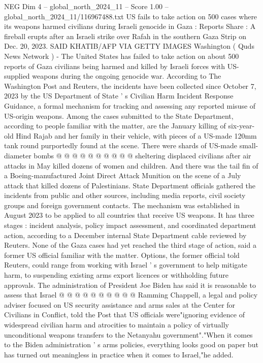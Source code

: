 \begin{textsample}{NEG Dim 4 – global\_north\_2024\_11 – Score 1.00 – global\_north\_2024\_11/116967488.txt}  \label{ex:f4_neg_175}
US fails to take action on 500 cases where its weapons harmed civilians during Israeli genocide in Gaza : Reports Share : A fireball erupts after an Israeli strike over Rafah in the southern Gaza Strip on Dec. 20, 2023.
SAID KHATIB/AFP VIA GETTY IMAGES Washington ( Quds News Network ) - The United States has failed to take action on about 500 reports of Gaza civilians being harmed and killed by Israeli forces with US-supplied weapons during the ongoing genocide war.
According to The Washington Post and Reuters, the incidents have been collected since October 7, 2023 by the US Department of State ' s Civilian Harm Incident Response Guidance, a formal mechanism for tracking and assessing any reported misuse of US-origin weapons.
Among the cases submitted to the State Department, according to people familiar with the matter, are the January killing of six-year-old Hind Rajab and her family in their vehicle, with pieces of a US-made 120mm tank round purportedly found at the scene.
There were shards of US-made small-diameter bombs @ @ @ @ @ @ @ @ @ @ sheltering displaced civilians after air attacks in May killed dozens of women and children.
And there was the tail fin of a Boeing-manufactured Joint Direct Attack Munition on the scene of a July attack that killed dozens of Palestinians.
State Department officials gathered the incidents from public and other sources, including media reports, civil society groups and foreign government contacts.
The mechanism was established in August 2023 to be applied to all countries that receive US weapons.
It has three stages : incident analysis, policy impact assessment, and coordinated department action, according to a December internal State Department cable reviewed by Reuters.
None of the Gaza cases had yet reached the third stage of action, said a former US official familiar with the matter.
Options, the former official told Reuters, could range from working with Israel ' s government to help mitigate harm, to suspending existing arms export licences or withholding future approvals.
The administration of President Joe Biden has said it is reasonable to assess that Israel @ @ @ @ @ @ @ @ @ @ Ramming Chappell, a legal and policy adviser focused on US security assistance and arms sales at the Center for Civilians in Conflict, told the Post that US officials were"ignoring evidence of widespread civilian harm and atrocities to maintain a policy of virtually unconditional weapons transfers to the Netanyahu government"."When it comes to the Biden administration ' s arms policies, everything looks good on paper but has turned out meaningless in practice when it comes to Israel,"he added.

\end{textsample}
